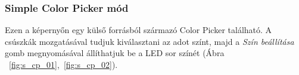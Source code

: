 \documentclass[../main.tex]{subfiles}
\begin{document}
            
        
        \subsubsection{Simple Color Picker mód} %
            Ezen a képernyőn egy külső forrásból származó Color Picker található. A csúszkák mozgatásával tudjuk kiválasztani az adot színt, majd a \textit{Szín beállítása} gomb megnyomásával állíthatjuk be a LED sor színét (Ábra ~\ref{fig:s_cp_01},~\ref{fig:s_cp_02}).
            
            \begin{figure}[h!]
                \begin{floatrow}
                \end{floatrow}
            \end{figure}\\
            
\end{document}
